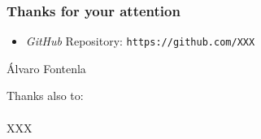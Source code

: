 \begin{frame} [fragile]
  \frametitle{Thanks for your attention}
    \begin{itemize}
    \item {\it GitHub} Repository: \texttt{https://github.com/XXX}
    \end{itemize}
    \begin{flushright}
    Álvaro Fontenla\\
    \end{flushright}
  \endblock{}
  Thanks also to: \\~\\
  {
    XXX
  }
\end{frame}
